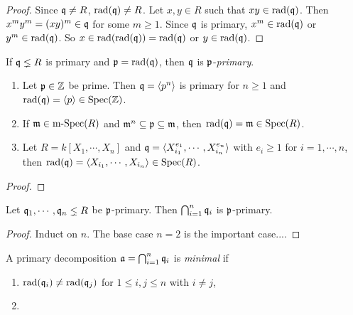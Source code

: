 \begin{proof}
    Since $\mathfrak{q} \neq R$, $\operatorname{rad}(\mathfrak{q}) \neq R$. Let $x,y \in R$ such that $xy \in \operatorname{rad}(\mathfrak{q})$. Then $x^{m}y^{m} = (xy)^{m} \in \mathfrak{q}$ for some $m \geq 1$. Since $\mathfrak{q}$ is primary, $x^{m} \in \operatorname{rad}(\mathfrak{q})$ or $y^{m} \in \operatorname{rad}(\mathfrak{q})$. So $x \in \operatorname{rad}(\operatorname{rad}(\mathfrak{q})) = \operatorname{rad}(\mathfrak{q})$ or $y \in \operatorname{rad}(\mathfrak{q})$.
\end{proof}

\begin{definition}
    If $\mathfrak{q} \lneq R$ is primary and $\mathfrak{p} = \operatorname{rad}(\mathfrak{q})$, then $\mathfrak{q}$ is $\mathfrak{p}$-\emph{primary}.
\end{definition}

\begin{example}
    \begin{enumerate}
        \item Let $\mathfrak{p} \in \mathbb{Z}$ be prime. Then $\mathfrak{q} = \langle  p^{n} \rangle$ is primary for $n \geq 1$ and $\operatorname{rad}(\mathfrak{q}) = \langle p  \rangle \in \operatorname{Spec}(\mathbb{Z})$. 
        \item 
            If $\mathfrak{m} \in \operatorname{m-Spec}(R)$ and $\mathfrak{m}^{n} \subseteq \mathfrak{p} \subseteq \mathfrak{m}$, then $\operatorname{rad}(\mathfrak{q}) = \mathfrak{m} \in \operatorname{Spec}(R)$.
        \item Let $R = k[X_1,\cdots,X_n]$ and $\mathfrak{q} = \langle X_{i_1}^{e_{1}},\cdots,X_{i_n}^{e_{n}} \rangle$ with $e_i \geq 1$ for $i=1,\cdots,n$, then $\operatorname{rad}(\mathfrak{q}) = \langle X_{i_1},\cdots,X_{i_n} \rangle \in \operatorname{Spec}(R)$.
    \end{enumerate}
\end{example}

\begin{proof}

\end{proof}

\begin{proposition}
    Let $\mathfrak{q}_1,\cdots,\mathfrak{q}_n \lneq R$ be $\mathfrak{p}$-primary. Then $\bigcap_{i=1}^{n} \mathfrak{q}_i$ is $\mathfrak{p}$-primary.
\end{proposition}

\begin{proof}
    Induct on $n$. The base case $n = 2$ is the important case....
\end{proof}

\begin{definition}
    A primary decomposition $\mathfrak{a} = \bigcap_{i=1}^{n}\mathfrak{q}_i$ is \emph{minimal} if 
    \begin{enumerate}
        \item $\operatorname{rad}(\mathfrak{q}_i) \neq \operatorname{rad}(\mathfrak{q}_j)$ for $1 \leq i,j \leq n$ with $i \neq j$,
        \item 
    \end{enumerate}
\end{definition}

